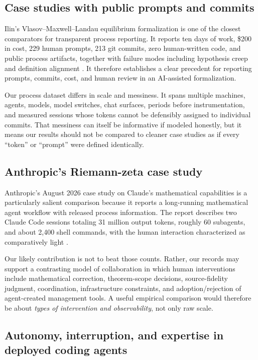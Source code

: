 \documentclass[11pt]{article}
\begin{document}
\subsection{Case studies with public prompts and commits}

Ilin's Vlasov--Maxwell--Landau equilibrium formalization is one of the closest
comparators for transparent process reporting.  It reports ten days of work,
\$200 in cost, 229 human prompts, 213 git commits, zero human-written code, and
public process artifacts, together with failure modes including hypothesis creep
and definition alignment \citep{ilin2026vml}.  It therefore establishes a clear
precedent for reporting prompts, commits, cost, and human review in an
AI-assisted formalization.

Our process dataset differs in scale and messiness.  It spans multiple machines,
agents, models, model switches, chat surfaces, periods before instrumentation,
and measured sessions whose tokens cannot be defensibly assigned to individual
commits.  That messiness can itself be informative if modeled honestly, but it
means our results should not be compared to cleaner case studies as if every
``token'' or ``prompt'' were defined identically.

\subsection{Anthropic's Riemann-zeta case study}

Anthropic's August 2026 case study on Claude's mathematical capabilities is a
particularly salient comparison because it reports a long-running mathematical
agent workflow with released process information.  The report describes two
Claude Code sessions totaling 31 million output tokens, roughly 60 subagents,
and about 2,400 shell commands, with the human interaction characterized as
comparatively light \citep{anthropic2026zeta}.

Our likely contribution is not to beat those counts.  Rather, our records may
support a contrasting model of collaboration in which human interventions
include mathematical correction, theorem-scope decisions, source-fidelity
judgment, coordination, infrastructure constraints, and adoption/rejection of
agent-created management tools.  A useful empirical comparison would therefore
be about \emph{types of intervention and observability}, not only raw scale.

\subsection{Autonomy, interruption, and expertise in deployed coding agents}
\end{document}
